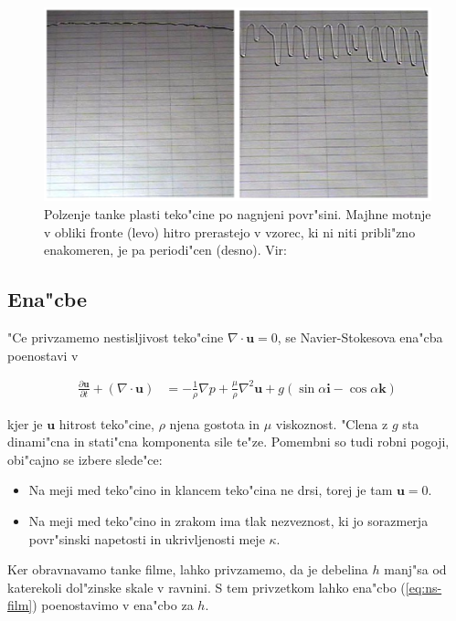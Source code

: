 \documentclass[a4paper,10pt]{article}
\renewcommand{\vec}{\mathbf}
\begin{document}
\begin{figure}[h]
\centering
 \includegraphics[width=.9\textwidth]{./Slike/film-slika}
\caption{Polzenje tanke plasti teko"cine po nagnjeni povr"sini. Majhne motnje v obliki fronte (levo) hitro prerastejo v vzorec, ki ni niti pribli"zno enakomeren, je pa periodi"cen (desno). Vir: \cite{kondic}}
\label{fig:film-neenakomernost}
\end{figure}

\subsection{Ena"cbe}

"Ce privzamemo nestisljivost teko"cine $\nabla \cdot \vec u = 0$, se Navier-Stokesova ena"cba poenostavi v 

\begin{align}
 \label{eq:ns-film}
 \frac{\partial \vec u}{\partial t} + (\nabla \cdot \vec u) &= -\frac{1}{\rho}\nabla p + \frac{\mu}{\rho}\nabla^2 \vec u + g (\sin \alpha \vec i - \cos \alpha \vec k)
\end{align}

kjer je $\vec u$ hitrost teko"cine, $\rho$ njena gostota in $\mu$ viskoznost. "Clena z $g$ sta dinami"cna in stati"cna komponenta sile te"ze. Pomembni so tudi robni pogoji, obi"cajno se izbere slede"ce:

\begin{itemize}
 \item Na meji med teko"cino in klancem teko"cina ne drsi, torej je tam $\vec u = 0$. 
 \item Na meji med teko"cino in zrakom ima tlak nezveznost, ki jo sorazmerja povr"sinski napetosti in ukrivljenosti meje $\kappa$. 
\end{itemize}

Ker obravnavamo tanke filme, lahko privzamemo, da je debelina $h$ manj"sa od katerekoli dol"zinske skale v ravnini. S tem privzetkom lahko ena"cbo (\ref{eq:ns-film}) poenostavimo v ena"cbo za $h$. 
\end{document}
